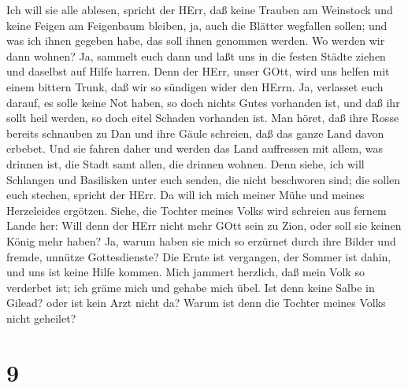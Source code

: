  Ich will sie alle ablesen, spricht der HErr, daß keine
Trauben am Weinstock und keine Feigen am Feigenbaum bleiben, ja, auch
die Blätter wegfallen sollen; und was ich ihnen gegeben habe, das soll
ihnen genommen werden.  Wo werden wir dann wohnen? Ja,
sammelt euch dann und laßt uns in die festen Städte ziehen und daselbst
auf Hilfe harren. Denn der HErr, unser GOtt, wird uns helfen mit einem
bittern Trunk, daß wir so sündigen wider den HErrn.  Ja,
verlasset euch darauf, es solle keine Not haben, so doch nichts Gutes
vorhanden ist, und daß ihr sollt heil werden, so doch eitel Schaden
vorhanden ist.  Man höret, daß ihre Rosse bereits schnauben
zu Dan und ihre Gäule schreien, daß das ganze Land davon erbebet. Und
sie fahren daher und werden das Land auffressen mit allem, was drinnen
ist, die Stadt samt allen, die drinnen wohnen.  Denn siehe,
ich will Schlangen und Basilisken unter euch senden, die nicht
beschworen sind; die sollen euch stechen, spricht der HErr.
 Da will ich mich meiner Mühe und meines Herzeleides
ergötzen.  Siehe, die Tochter meines Volks wird schreien
aus fernem Lande her: Will denn der HErr nicht mehr GOtt sein zu Zion,
oder soll sie keinen König mehr haben? Ja, warum haben sie mich so
erzürnet durch ihre Bilder und fremde, unnütze Gottesdienste?
 Die Ernte ist vergangen, der Sommer ist dahin, und uns ist
keine Hilfe kommen.  Mich jammert herzlich, daß mein Volk
so verderbet ist; ich gräme mich und gehabe mich übel.  Ist
denn keine Salbe in Gilead? oder ist kein Arzt nicht da? Warum ist denn
die Tochter meines Volks nicht geheilet?

\hypertarget{section-8}{%
\section{9}\label{section-8}}

